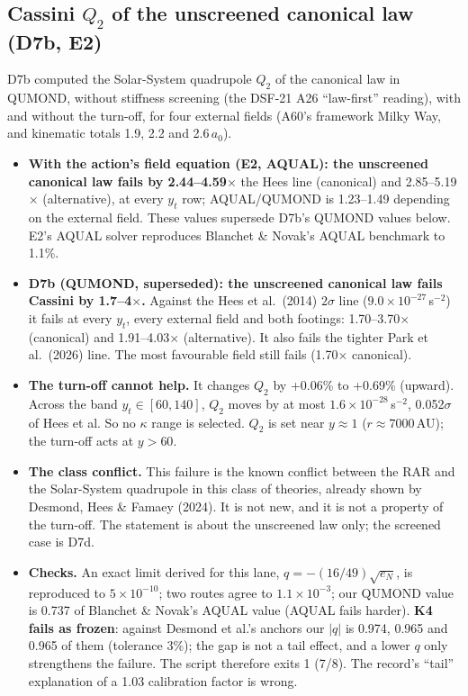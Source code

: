 \documentclass[10pt]{article}
\begin{document}
\subsection{Cassini $Q_2$ of the unscreened canonical law (D7b, E2)}
D7b computed the Solar-System quadrupole $Q_2$ of the canonical law in QUMOND, without stiffness screening (the DSF-21 A26 ``law-first'' reading), with and without the turn-off, for four external fields (A60's framework Milky Way, and kinematic totals 1.9, 2.2 and 2.6\,$a_0$).
\begin{itemize}
\item \textbf{With the action's field equation (E2, AQUAL): the unscreened canonical law fails by 2.44--4.59$\times$} the Hees line (canonical) and 2.85--5.19$\times$ (alternative), at every $y_t$ row; AQUAL/QUMOND is 1.23--1.49 depending on the external field. These values supersede D7b's QUMOND values below. E2's AQUAL solver reproduces Blanchet \& Novak's AQUAL benchmark to 1.1\%.
\item \textbf{D7b (QUMOND, superseded): the unscreened canonical law fails Cassini by 1.7--4$\times$.} Against the Hees et al.\ (2014) $2\sigma$ line ($9.0\times10^{-27}$\,s$^{-2}$) it fails at every $y_t$, every external field and both footings: 1.70--3.70$\times$ (canonical) and 1.91--4.03$\times$ (alternative). It also fails the tighter Park et al.\ (2026) line. The most favourable field still fails (1.70$\times$ canonical).
\item \textbf{The turn-off cannot help.} It changes $Q_2$ by +0.06\% to +0.69\% (upward). Across the band $y_t\in[60,140]$, $Q_2$ moves by at most $1.6\times10^{-28}$\,s$^{-2}$, 0.052$\sigma$ of Hees et al. So no $\kappa$ range is selected. $Q_2$ is set near $y\approx1$ ($r\approx7000$\,AU); the turn-off acts at $y>60$.
\item \textbf{The class conflict.} This failure is the known conflict between the RAR and the Solar-System quadrupole in this class of theories, already shown by Desmond, Hees \& Famaey (2024). It is not new, and it is not a property of the turn-off. The statement is about the unscreened law only; the screened case is D7d.
\item \textbf{Checks.} An exact limit derived for this lane, $q=-(16/49)\sqrt{e_N}$, is reproduced to $5\times10^{-10}$; two routes agree to $1.1\times10^{-3}$; our QUMOND value is 0.737 of Blanchet \& Novak's AQUAL value (AQUAL fails harder). \textbf{K4 fails as frozen}: against Desmond et al.'s anchors our $|q|$ is 0.974, 0.965 and 0.965 of them (tolerance 3\%); the gap is not a tail effect, and a lower $q$ only strengthens the failure. The script therefore exits 1 (7/8). The record's ``tail'' explanation of a 1.03 calibration factor is wrong.
\end{itemize}
\end{document}
